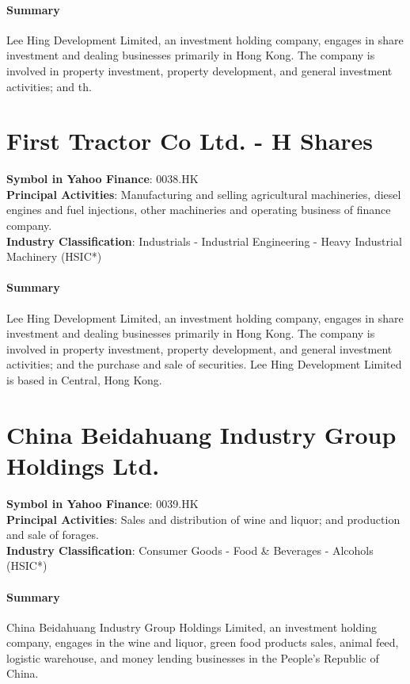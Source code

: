 \paragraph{Summary}
Lee Hing Development Limited, an investment holding company, engages in share investment and dealing businesses primarily in Hong Kong. The company is involved in property investment, property development, and general investment activities; and th.


\section{First Tractor Co Ltd. - H Shares}
\textbf{Symbol in Yahoo Finance}: 0038.HK\\
\textbf{Principal Activities}: Manufacturing and selling agricultural machineries, diesel engines and fuel injections, other machineries and operating business of finance company.\\
\textbf{Industry Classification}: Industrials - Industrial Engineering - Heavy Industrial Machinery (HSIC*)
\paragraph{Summary}
Lee Hing Development Limited, an investment holding company, engages in share investment and dealing businesses primarily in Hong Kong. The company is involved in property investment, property development, and general investment activities; and the purchase and sale of securities. Lee Hing Development Limited is based in Central, Hong Kong.


\section{China Beidahuang Industry Group Holdings Ltd.}
\textbf{Symbol in Yahoo Finance}: 0039.HK\\
\textbf{Principal Activities}: Sales and distribution of wine and liquor; and production and sale of forages.\\
\textbf{Industry Classification}: Consumer Goods - Food \& Beverages - Alcohols (HSIC*)
\paragraph{Summary}
China Beidahuang Industry Group Holdings Limited, an investment holding company, engages in the wine and liquor, green food products sales, animal feed, logistic warehouse, and money lending businesses in the People's Republic of China.


